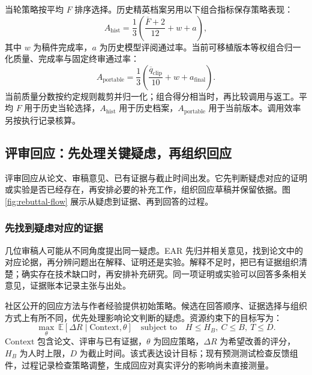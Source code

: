 当轮策略按平均 $F$ 排序选择。历史精英档案另用以下组合指标保存策略表现：
\begin{equation}
A_{\mathrm{hist}}=\frac{1}{3}\left(\frac{\overline F+2}{12}+w+a\right),
\label{eq:archive-fitness}
\end{equation}
其中 $w$ 为稿件完成率，$a$ 为历史模型评阅通过率。当前可移植版本等权组合归一化质量、完成率与固定终审通过率：
\begin{equation}
A_{\mathrm{portable}}=\frac{1}{3}\left(\frac{\overline q_{\mathrm{clip}}}{10}+w+a_{\mathrm{final}}\right).
\label{eq:portable-fitness}
\end{equation}
当前质量分数按约定规则裁剪并归一化；组合得分相当时，再比较调用与返工。平均 $F$ 用于历史当轮选择，$A_{\mathrm{hist}}$ 用于历史档案，$A_{\mathrm{portable}}$ 用于当前版本。调用效率另按执行记录核算。

\FloatBarrier
\subsection{评审回应：先处理关键疑虑，再组织回应}
\label{sec:rebuttal}
评审回应从论文、审稿意见、已有证据与截止时间出发。它先判断疑虑对应的证明或实验是否已经存在，再安排必要的补充工作，组织回应草稿并保留依据。图\ref{fig:rebuttal-flow} 展示从疑虑到证据、再到回答的过程。


\subsubsection{先找到疑虑对应的证据}
几位审稿人可能从不同角度提出同一疑虑。EAR 先归并相关意见，找到论文中的对应论据，再分辨问题出在解释、证明还是实验。解释不足时，把已有证据组织清楚；确实存在技术缺口时，再安排补充研究。同一项证明或实验可以回答多条相关意见，证据账本记录主张与出处。

社区公开的回应方法与作者经验提供初始策略。候选在回答顺序、证据选择与组织方式上有所不同，优先处理影响论文判断的疑虑。资源约束下的目标写为：
\begin{equation}
\max_{\theta}\ \mathbb E[\Delta R\mid\mathrm{Context},\theta]
\quad\text{subject to}\quad H\le H_B,\ C\le B,\ T\le D.
\label{eq:rebuttal-objective}
\end{equation}
$\mathrm{Context}$ 包含论文、评审与已有证据，$\theta$ 为回应策略，$\Delta R$ 为希望改善的评分，$H_B$ 为人时上限，$D$ 为截止时间。该式表达设计目标；现有预测测试检查反馈组件，过程记录检查策略调整，生成回应对真实评分的影响尚未直接测量。


